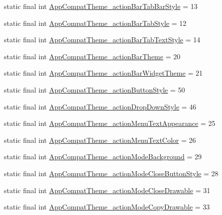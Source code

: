 \begin{CompactItemize}
\item 
static final int \hyperlink{classandroid_1_1support_1_1v4_1_1_r_1_1styleable_f88289a95a6edd4e037e864093455f6a}{AppCompatTheme\_\-actionBarTabBarStyle} = 13
\item 
static final int \hyperlink{classandroid_1_1support_1_1v4_1_1_r_1_1styleable_d41958baadf80c6e15b8c8c98ee941f2}{AppCompatTheme\_\-actionBarTabStyle} = 12
\item 
static final int \hyperlink{classandroid_1_1support_1_1v4_1_1_r_1_1styleable_638a87bf99ca4d6078c162044ec4dbbc}{AppCompatTheme\_\-actionBarTabTextStyle} = 14
\item 
static final int \hyperlink{classandroid_1_1support_1_1v4_1_1_r_1_1styleable_2b2e4f39df58cecdc1b9bf54757c7e22}{AppCompatTheme\_\-actionBarTheme} = 20
\item 
static final int \hyperlink{classandroid_1_1support_1_1v4_1_1_r_1_1styleable_1e7154e75762f816225eec7fd9d1ca7b}{AppCompatTheme\_\-actionBarWidgetTheme} = 21
\item 
static final int \hyperlink{classandroid_1_1support_1_1v4_1_1_r_1_1styleable_4a5b2d32e9dd1e13e612b6d13ac23006}{AppCompatTheme\_\-actionButtonStyle} = 50
\item 
static final int \hyperlink{classandroid_1_1support_1_1v4_1_1_r_1_1styleable_cea968e94c1465c9f1c390fe9de9567c}{AppCompatTheme\_\-actionDropDownStyle} = 46
\item 
static final int \hyperlink{classandroid_1_1support_1_1v4_1_1_r_1_1styleable_5430afc19e0b78b7dc7aee394d785df7}{AppCompatTheme\_\-actionMenuTextAppearance} = 25
\item 
static final int \hyperlink{classandroid_1_1support_1_1v4_1_1_r_1_1styleable_7c5193ab46252c56ec1b49d531de7e9d}{AppCompatTheme\_\-actionMenuTextColor} = 26
\item 
static final int \hyperlink{classandroid_1_1support_1_1v4_1_1_r_1_1styleable_f70d7a35bb0b3c72eebdf5c561070a1d}{AppCompatTheme\_\-actionModeBackground} = 29
\item 
static final int \hyperlink{classandroid_1_1support_1_1v4_1_1_r_1_1styleable_cdb6ed50e0449f44c75352a5178b4674}{AppCompatTheme\_\-actionModeCloseButtonStyle} = 28
\item 
static final int \hyperlink{classandroid_1_1support_1_1v4_1_1_r_1_1styleable_b09f6cbf2975e5f044f4db1c3f5be82e}{AppCompatTheme\_\-actionModeCloseDrawable} = 31
\item 
static final int \hyperlink{classandroid_1_1support_1_1v4_1_1_r_1_1styleable_6efcfd6f29a1ed5f1e115d527ad02db2}{AppCompatTheme\_\-actionModeCopyDrawable} = 33

\end{CompactItemize}
